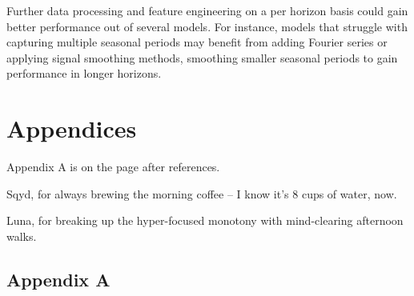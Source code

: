 \documentclass[sigconf]{acmart}
\begin{document}
Further data processing and feature engineering on a per horizon basis could gain better performance out of several models. For instance, models that struggle with capturing multiple seasonal periods may benefit from adding Fourier series or applying signal smoothing methods, smoothing smaller seasonal periods to gain performance in longer horizons.

\section{Appendices}
Appendix A is on the page after references.
\begin{acks}
 \hspace{3mm} Sqyd, for always brewing the morning coffee -- I know it's 8 cups of water, now.

Luna, for breaking up the hyper-focused monotony with mind-clearing afternoon walks.
\end{acks}




\onecolumn
\subsection{Appendix A}
\end{document}
